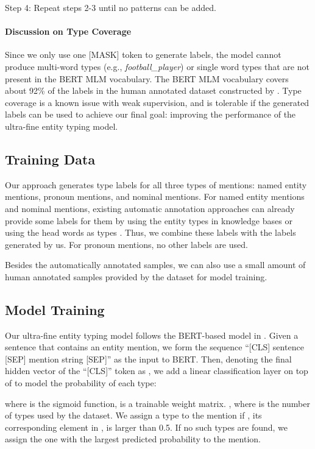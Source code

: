 \documentclass[11pt,a4paper]{article}
\begin{document}
\noindent\hangindent=1.2cm Step 4: Repeat steps 2-3 until no patterns can be added.

\paragraph{Discussion on Type Coverage} Since we only use one [MASK] token to generate labels, the model cannot produce multi-word types (e.g., \textit{football\_player}) or single word types that are not present in the BERT MLM vocabulary. The BERT MLM vocabulary covers about 92\% of the labels in the human annotated dataset constructed by \citet{choi2018ultra}.
Type coverage is a known issue with weak supervision, and is tolerable if the generated labels can be used to achieve our final goal: improving the performance of the ultra-fine entity typing model.

\subsection{Training Data}

Our approach generates type labels for all three types of mentions: named entity mentions, pronoun mentions, and nominal mentions.
For named entity mentions and nominal mentions, existing automatic annotation approaches can already provide some labels for them by using the entity types in knowledge bases or using the head words as types \cite{ling2012fine,choi2018ultra}. Thus, we combine these labels with the labels generated by us.
For pronoun mentions, no other labels are used.

Besides the automatically annotated samples, we can also use a small amount of human annotated samples provided by the dataset for model training.

\subsection{Model Training}
\label{sec:model-train}

Our ultra-fine entity typing model follows the BERT-based model in \cite{onoe2019learning}. Given a sentence that contains an entity mention, we form the sequence 
``[CLS] sentence [SEP] mention string [SEP]'' as the input to BERT.  
Then, denoting the final hidden vector of the ``[CLS]'' token as , we add a linear classification layer on top of  to model the probability of each type:

where  is the sigmoid function,  is a trainable weight matrix. , where  is the number of types used by the dataset. We assign a type  to the mention if , its corresponding element in , is larger than 0.5. If no such types are found, we assign the one with the largest predicted probability to the mention.
\end{document}
